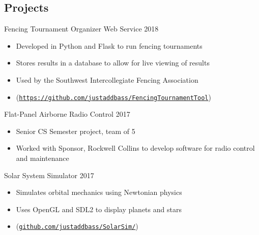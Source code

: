 \documentclass[line,margin]{res}
\begin{document}
\begin{resume}
\section{Projects}
\vspace{12pt}


Fencing Tournament Organizer Web Service
\hfill 2018
	\begin{itemize} \itemsep -2pt
		\item Developed in Python and Flask to run fencing tournaments
		\item Stores results in a database to allow for live viewing of results
		\item Used by the Southwest Intercollegiate Fencing Association
		\item (\href{https://github.com/justaddbass/FencingTournamentTool}{\texttt{https://github.com/justaddbass/FencingTournamentTool}})
	\end{itemize}

\vspace{-8pt}
Flat-Panel Airborne Radio Control
\hfill 2017
	\begin{itemize} \itemsep -2pt
		\item Senior CS Semester project, team of 5
		\item Worked with Sponsor, Rockwell Collins to develop software for radio control and maintenance
	\end{itemize}

\vspace{-8pt}
Solar System Simulator
\hfill 2017
	\begin{itemize} \itemsep -2pt
		\item Simulates orbital mechanics using Newtonian physics
		\item Uses OpenGL and SDL2 to display planets and stars
		\item (\href{https://github.com/justaddbass/SolarSim/}{\texttt{github.com/justaddbass/SolarSim/}})
	\end{itemize}


\end{resume}
\end{document}
